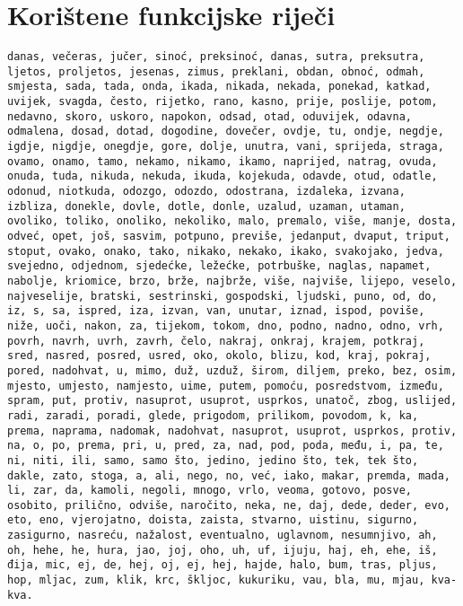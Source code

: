 \documentclass{article}
\begin{document}
\newpage

\section{Korištene funkcijske riječi}
\label{sec:koristene-fw}
\texttt{danas, večeras, jučer, sinoć, preksinoć, danas, sutra, preksutra, ljetos,
proljetos, jesenas, zimus, preklani, obdan, obnoć, odmah, smjesta, sada, tada,
onda, ikada, nikada, nekada, ponekad, katkad, uvijek, svagda, često, rijetko,
rano, kasno, prije, poslije, potom, nedavno, skoro, uskoro, napokon, odsad, otad,
oduvijek, odavna, odmalena, dosad, dotad, dogodine, dovečer, ovdje, tu, ondje,
negdje, igdje, nigdje, onegdje, gore, dolje, unutra, vani, sprijeda, straga,
ovamo, onamo, tamo, nekamo, nikamo, ikamo, naprijed, natrag, ovuda, onuda, tuda,
nikuda, nekuda, ikuda, kojekuda, odavde, otud, odatle, odonud, niotkuda, odozgo,
odozdo, odostrana, izdaleka, izvana, izbliza, donekle, dovle, dotle, donle,
uzalud, uzaman, utaman, ovoliko, toliko, onoliko, nekoliko, malo, premalo, više,
manje, dosta, odveć, opet, još, sasvim, potpuno, previše, jedanput, dvaput,
triput, stoput, ovako, onako, tako, nikako, nekako, ikako, svakojako, jedva,
svejedno, odjednom, sjedećke, ležećke, potrbuške, naglas, napamet, nabolje,
kriomice, brzo, brže, najbrže, više, najviše, lijepo, veselo, najveselije,
bratski, sestrinski, gospodski, ljudski, puno, od, do, iz, s, sa, ispred, iza,
izvan, van, unutar, iznad, ispod, poviše, niže, uoči, nakon, za, tijekom, tokom,
dno, podno, nadno, odno, vrh, povrh, navrh, uvrh, zavrh, čelo, nakraj, onkraj,
krajem, potkraj, sred, nasred, posred, usred, oko, okolo, blizu, kod, kraj,
pokraj, pored, nadohvat, u, mimo, duž, uzduž, širom, diljem, preko, bez, osim,
mjesto, umjesto, namjesto, uime, putem, pomoću, posredstvom, između, spram, put,
protiv, nasuprot, usuprot, usprkos, unatoč, zbog, uslijed, radi, zaradi, poradi,
glede, prigodom, prilikom, povodom, k, ka, prema, naprama, nadomak, nadohvat,
nasuprot, usuprot, usprkos, protiv, na, o, po, prema, pri, u, pred, za, nad, pod,
poda, među, i, pa, te, ni, niti, ili, samo, samo što, jedino, jedino što, tek,
tek što, dakle, zato, stoga, a, ali, nego, no, već, iako, makar, premda, mada,
li, zar, da, kamoli, negoli, mnogo, vrlo, veoma, gotovo, posve, osobito,
prilično, odviše, naročito, neka, ne, daj, dede, deder, evo, eto, eno,
vjerojatno, doista, zaista, stvarno, uistinu, sigurno, zasigurno, nasreću,
nažalost, eventualno, uglavnom, nesumnjivo, ah, oh, hehe, he, hura, jao, joj,
oho, uh, uf, ijuju, haj, eh, ehe, iš, đija, mic, ej, de, hej, oj, ej, hej, hajde,
halo, bum, tras, pljus, hop, mljac, zum, klik, krc, škljoc, kukuriku, vau, bla,
mu, mjau, kva-kva.}
\end{document}
